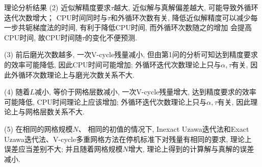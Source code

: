 \documentclass{article}
\begin{document}
\begin{section}{理论分析结果}
   (2) 近似解精度要求$\tau$越大, 近似解与真解偏差越大, 可能导致外循环迭代次数增大； CPU时间同时与$\tau$和外循环次数有关, 降低近似解精度可以减少每一步共轭梯度法的时间, 有利于降低CPU时间, 而外循环次数随之的增加
   会提高CPU时间, 故CPU时间随$\tau$的变化不便预测. 

   (3) 前后磨光次数越多, 一次V-cycle残量减小, 但由第1问的分析可知达到精度要求的效率可能降低, 因此CPU时间可能增加; 外循环迭代次数理论上只与$\alpha,\tau$有关, 因此外循环次数理论上与磨光次数关系不大. 

   (4) 随着$L$减小, 等价于网格层数减小, 一次V-cycle残量增大, 达到精度要求的效率可能降低, CPU时间理论上应该增加; 外循环迭代次数理论上只与$\alpha,\tau$有关, 因此理论上与网格层数关系不大.

   (5) 在相同的网格规模$N$、 相同的初值的情况下, Inexact Uzawa迭代法和Exact Uzawa迭代法、V-cycle多重网格方法在停机标准下对残量有相同的要求, 理论上
   误差应当差别不大; 并且随着网格规模$N$增大, 理论上得到的计算解与真解的误差减小.
\end{section}
\end{document}
